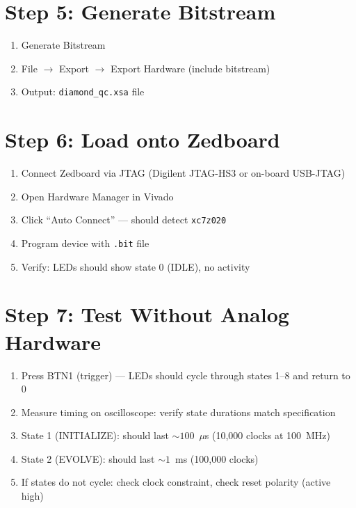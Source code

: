 \documentclass[11pt,a4paper,openany]{book}
\begin{document}
\section{Step 5: Generate Bitstream}

\begin{enumerate}[nosep]
  \item Generate Bitstream
  \item File $\to$ Export $\to$ Export Hardware (include bitstream)
  \item Output: \texttt{diamond\_qc.xsa} file
\end{enumerate}

\section{Step 6: Load onto Zedboard}

\begin{enumerate}[nosep]
  \item Connect Zedboard via JTAG (Digilent JTAG-HS3 or on-board USB-JTAG)
  \item Open Hardware Manager in Vivado
  \item Click ``Auto Connect'' --- should detect \texttt{xc7z020}
  \item Program device with \texttt{.bit} file
  \item Verify: LEDs should show state 0 (IDLE), no activity
\end{enumerate}

\section{Step 7: Test Without Analog Hardware}

\begin{enumerate}[nosep]
  \item Press BTN1 (trigger) --- LEDs should cycle through states 1--8 and return to 0
  \item Measure timing on oscilloscope: verify state durations match specification
  \item State 1 (INITIALIZE): should last ${\sim}100$~$\mu$s (10,000 clocks at 100~MHz)
  \item State 2 (EVOLVE): should last ${\sim}1$~ms (100,000 clocks)
  \item If states do not cycle: check clock constraint, check reset polarity (active high)
\end{enumerate}


\end{document}
